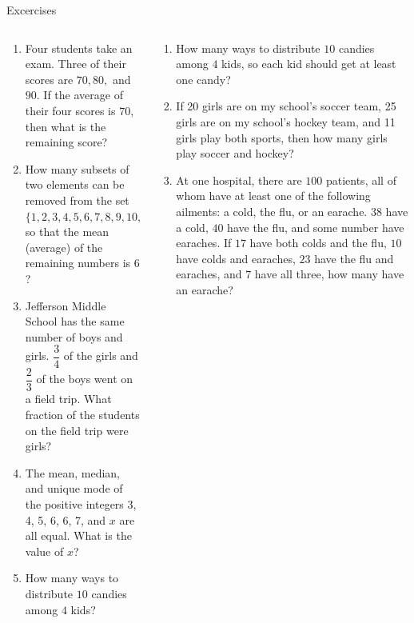 \documentclass[9pt,aspectratio=169]{beamer}
\begin{document}
\begin{frame}{Excercises}
  \begin{columns}[T]
    \begin{column}{0.5\textwidth}
      \begin{enumerate}
        \item Four students take an exam. Three of their scores are $70, 80,$ and $90$. If the average of their four scores is $70$, then what is the remaining score? %
        \item How many subsets of two elements can be removed from the set $\{1, 2, 3, 4, 5, 6, 7, 8, 9, 10, 11\}$ so that the mean (average) of the remaining numbers is $6$? %
        \item Jefferson Middle School has the same number of boys and girls. $\dfrac{3}{4}$ of the girls and $\dfrac{2}{3}$ of the boys went on a field trip. What fraction of the students on the field trip were girls? %
        \item The mean, median, and unique mode of the positive integers 3, 4, 5, 6, 6, 7, and $x$ are all equal. What is the value of $x$? %
        \item How many ways to distribute $10$ candies among $4$ kids?
        \seti
      \end{enumerate}
    \end{column}
    \begin{column}{0.5\textwidth}
      \begin{enumerate}
        \conti
        \item How many ways to distribute $10$ candies among $4$ kids, so each kid should get at least one candy?
        \item If 20 girls are on my school's soccer team, 25 girls are on my school's hockey team, and 11 girls play both sports, then how many girls play soccer and hockey? %
        \item At one hospital, there are $100$ patients, all of whom have at least one of the following ailments: a cold, the flu, or an earache. $38$ have a cold, $40$ have the flu, and some number have earaches. If $17$ have both colds and the flu, $10$ have colds and earaches, $23$ have the flu and earaches, and $7$ have all three, how many have an earache? %
      \end{enumerate}
    \end{column}
  \end{columns}
\end{frame}
\end{document}
